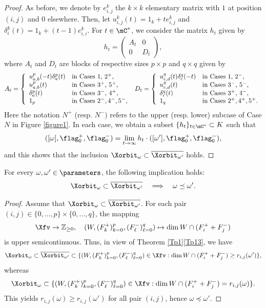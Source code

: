 \begin{proof}
As before, we denote by $e_{i,j}^k$ the $k\times k$ elementary matrix
with $1$ at position $(i,j)$ and $0$ elsewhere.
Then, let $u_{i,j}^k(t)=1_k+te_{i,j}^k$ and $\delta_i^k(t)=1_k+(t-1)e_{i,i}^k$.
For $t\in\mC^*$, we consider the matrix $h_t$ given by
\[h_t=\begin{pmatrix} A_t & 0\\ 0 & D_t \end{pmatrix},\]
where $A_t$ and $D_t$ are blocks of respective sizes $p\times p$ and $q\times q$ given by
\[
A_t=\left\{
\begin{array}{ll}
u_{a,b}^p(-t)\delta^p_a(t) & \mbox{in Cases 1, $2^+$,}\\
u_{a,b}^p(t) & \mbox{in Cases $3^+$, $5^+$,}\\
\delta_a^p(t) & \mbox{in Cases $3^-$, $4^+$,}\\
1_p & \mbox{in Cases $2^-$,\,$4^-$,\,$5^-$,}
\end{array}
\right.
\
D_t=\left\{
\begin{array}{ll}
u^q_{c,d}(t)\delta^q_c(-t) & \mbox{in Cases 1, $2^-$,}\\
u_{c,d}^q(t) & \mbox{in Cases $3^-$, $5^-$,}\\
\delta_c^q(t) & \mbox{in Cases $3^+$, $4^-$,}\\
1_q & \mbox{in Cases $2^+$,\,$4^+$,\,$5^+$.}
\end{array}
\right.
\]
Here the notation $N^+$ (resp. $N^-$) refers to the upper (resp. lower) subcase of Case $N$ in Figure \ref{figure1}.
In each case, we obtain a subset $\{h_t\}_{t\in\mC^*}\subset K$ such that
\[([\omega],\flag_0^+,\flag_0^-)=\lim_{t\to \infty}h_t\cdot([\omega'],\flag_0^+,\flag_0^-),\]
and this shows that the inclusion $\Xorbit_\omega\subset\overline{\Xorbit_{\omega'}}$ holds.
\end{proof}

\begin{lemma}
\label{L3.5}
For every $\omega,\omega'\in\parameters$, the following implication holds:
\[\Xorbit_\omega\subset\overline{\Xorbit_{\omega'}}\quad\Longrightarrow\quad \omega\preceq\omega'.\]
\end{lemma}

\begin{proof}
Assume that $\Xorbit_\omega\subset\overline{\Xorbit_{\omega'}}$. For each pair $(i,j)\in\{0,\ldots,p\}\times\{0,\ldots,q\}$, the mapping
\[
\Xfv\to\mathbb{Z}_{\geq 0},\quad (W,(F^+_k)_{k=0}^p,(F^-_\ell)_{\ell=0}^q)\mapsto \dim W\cap(F_i^++F_j^-)
\]
is upper semicontinuous. Thus, in view of Theorem \ref{Tp1}\ref{Tp13}, we have
\[
\Xorbit_\omega\subset \overline{\Xorbit_{\omega'}}\subset\{(W,(F^+_k)_{k=0}^p,(F^-_\ell)_{\ell=0}^q)\in\Xfv:\dim W\cap (F_i^++F_j^-)\geq r_{i,j}(\omega')\},
\]
whereas
\[
\Xorbit_\omega\subset\{(W,(F^+_k)_{k=0}^p,(F^-_\ell)_{\ell=0}^q)\in\Xfv:\dim W\cap (F_i^++F_j^-)=r_{i,j}(\omega)\}.
\]
This yields $r_{i,j}(\omega)\geq r_{i,j}(\omega')$ for all pair $(i,j)$, hence $\omega\preceq\omega'$.
\end{proof}


